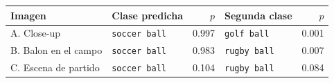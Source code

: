 \begin{tabular}{llrlr}
\toprule
Imagen & Clase predicha & $p$ & Segunda clase & $p$ \\
\midrule
A. Close-up & \texttt{soccer ball} & 0.997 & \texttt{golf ball} & 0.001 \\
B. Balon en el campo & \texttt{soccer ball} & 0.983 & \texttt{rugby ball} & 0.007 \\
C. Escena de partido & \texttt{soccer ball} & 0.104 & \texttt{rugby ball} & 0.084 \\
\bottomrule
\end{tabular}
